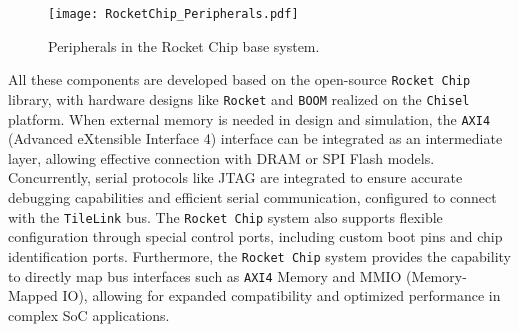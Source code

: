 \begin{figure}[h!]
    \centering
    \texttt{[image: RocketChip\_Peripherals.pdf]}
    \caption{Peripherals in the Rocket Chip base system.}
    \label{fig:rocketchip_base_peripherals}
\end{figure}



All these components are developed based on the open-source \texttt{Rocket Chip} library, with hardware designs like \texttt{Rocket} and \texttt{BOOM} realized on the \texttt{Chisel} platform. When external memory is needed in design and simulation, the \texttt{AXI4} (Advanced eXtensible Interface 4) interface can be integrated as an intermediate layer, allowing effective connection with DRAM or SPI Flash models. Concurrently, serial protocols like JTAG are integrated to ensure accurate debugging capabilities and efficient serial communication, configured to connect with the \texttt{TileLink} bus. The \texttt{Rocket Chip} system also supports flexible configuration through special control ports, including custom boot pins and chip identification ports. Furthermore, the \texttt{Rocket Chip} system provides the capability to directly map bus interfaces such as \texttt{AXI4} Memory and MMIO (Memory-Mapped IO), allowing for expanded compatibility and optimized performance in complex SoC applications.

